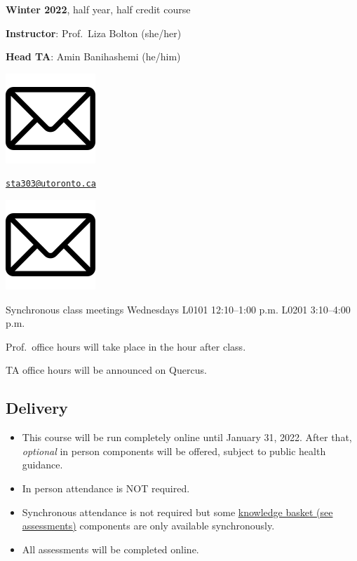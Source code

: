\documentclass[
]{book}
\begin{document}
\textbf{Winter 2022}, half year, half credit course

\textbf{Instructor}: Prof.~Liza Bolton (she/her)

\textbf{Head TA}: Amin Banihashemi (he/him)

\begin{center}\includegraphics[width=0.25\linewidth]{images/syllabus/email} \end{center}

\href{mailto:sta303@utoronto.ca}{\nolinkurl{sta303@utoronto.ca}}

\begin{center}\includegraphics[width=0.25\linewidth]{images/syllabus/email} \end{center}

Synchronous class meetings
Wednesdays
L0101 12:10--1:00 p.m.
L0201 3:10--4:00 p.m.

Prof.~office hours will take place in the hour after class.

TA office hours will be announced on Quercus.

\hypertarget{delivery}{%
\subsection{Delivery}\label{delivery}}

\begin{itemize}
\item
  This course will be run completely online until January 31, 2022. After that, \emph{optional} in person components will be offered, subject to public health guidance.
\item
  In person attendance is NOT required.
\item
  Synchronous attendance is not required but some \protect\hyperlink{assessments}{knowledge basket (see assessments)} components are only available synchronously.
\item
  All assessments will be completed online.
\end{itemize}
\end{document}
